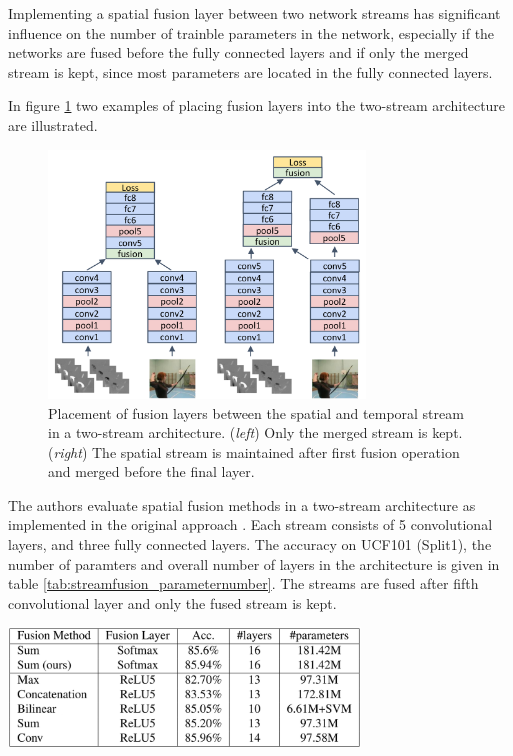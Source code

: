 Implementing a spatial fusion layer between two network streams has significant influence on the number of trainble parameters in the network, especially if the networks are fused before the fully connected layers and if only the merged stream is kept, since most parameters are located in the fully connected layers.

In figure \ref{fig:streamfusion_layerplacement} two examples of placing fusion layers into the two-stream architecture are illustrated.

\begin{figure}[H]
    \centering
    \includegraphics[width=0.75\textwidth]{img_deep/streamfusion_layerplacement}
    \caption{Placement of fusion layers between the spatial and temporal stream in a two-stream architecture. (\textit{left}) Only the merged stream is kept. (\textit{right}) The spatial stream is maintained after first fusion operation and merged before the final layer. \cite{feichtenhofer_convolutional_2016}}
    \label{fig:streamfusion_layerplacement}
\end{figure}

The authors evaluate spatial fusion methods in a two-stream architecture as implemented in the original approach \cite{simonyan_two-stream_2014}.
Each stream consists of 5 convolutional layers, and three fully connected layers.
The accuracy on UCF101 (Split1), the number of paramters and overall number of layers in the architecture is given in table \ref{tab:streamfusion_parameternumber}.
The streams are fused after fifth convolutional layer and only the fused stream is kept.

\begin{table}[H]
    \centering
    \includegraphics[width=0.7\textwidth]{img_deep/streamfusion_parameternumber}
    \caption{Performance and number of parameters for different spatial fusion methods in a two-stream setup, evaluated on UCF101 (split 1) \cite{feichtenhofer_convolutional_2016}}
    \label{tab:streamfusion_parameternumber}
\end{table}

